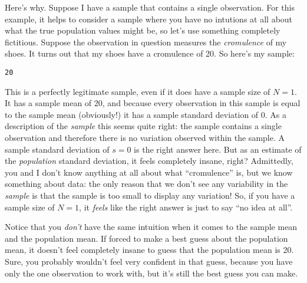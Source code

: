Here's why. Suppose I have a sample that contains a single observation. For this example, it helps to consider a sample where you have no intutions at all about what the true population values might be, so let's use something completely fictitious. Suppose the observation in question measures the {\it cromulence} of my shoes. It turns out that my shoes have a cromulence of 20. So here's my sample:
\begin{center}
\texttt{20}
\end{center}
This is a perfectly legitimate sample, even if it does have a sample size of $N=1$. It has a sample mean of 20, and because every observation in this sample is equal to the sample mean (obviously!) it has a sample standard deviation of 0. As a description of the {\it sample} this seems quite right: the sample contains a single observation and therefore there is no variation observed within the sample. A sample standard deviation of $s = 0$ is the right answer here. But as an estimate of the {\it population} standard deviation, it feels completely insane, right? Admittedly, you and I don't know anything at all about what ``cromulence'' is, but we know something about data: the only reason that we don't see any variability in the {\it sample} is that the sample is too small to display any variation! So, if you have a sample size of $N=1$, it {\it feels} like the right answer is just to say ``no idea at all''. 

Notice that you {\it don't} have the same intuition when it comes to the sample mean and the population mean. If forced to make a best guess about the population mean, it doesn't feel completely insane to guess that the population mean is 20. Sure, you probably wouldn't feel very confident in that guess, because you have only the one observation to work with, but it's still the best guess you can make. 

